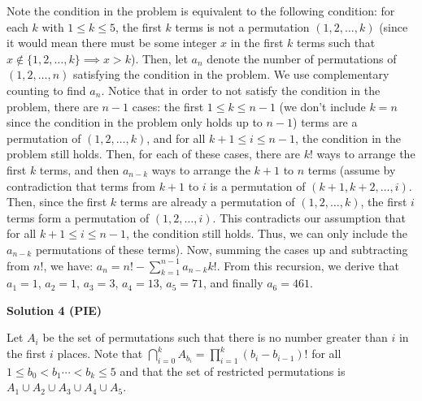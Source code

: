 \begin{enumerate}
Note the condition in the problem is equivalent to the following condition: for each $k$ with $1 \le k \le 5$, the first $k$ terms is not a permutation $(1, 2, \ldots, k)$ (since it would mean there must be some integer $x$ in the first $k$ terms such that $x \not \in \{1, 2, \ldots, k\} \implies x > k$). Then, let $a_n$ denote the number of permutations of $(1, 2, \ldots, n)$ satisfying the condition in the problem. We use complementary counting to find $a_n$. Notice that in order to not satisfy the condition in the problem, there are $n-1$ cases: the first $1 \le k \le n-1$ (we don't include $k = n$ since the condition in the problem only holds up to $n-1$) terms are a permutation of $(1, 2, \ldots, k)$, and for all $k+1 \le i \le n-1$, the condition in the problem still holds. Then, for each of these cases, there are $k!$ ways to arrange the first $k$ terms, and then $a_{n-k}$ ways to arrange the $k + 1$ to $n$ terms (assume by contradiction that terms from $k+1$ to $i$ is a permutation of $(k+1, k+2, \ldots, i)$. Then, since the first $k$ terms are already a permutation of $(1, 2, \ldots, k)$, the first $i$ terms form a permutation of $(1, 2, \ldots, i)$. This contradicts our assumption that for all $k+1 \le i \le n-1$, the condition still holds. Thus, we can only include the $a_{n-k}$ permutations of these terms). Now, summing the cases up and subtracting from $n!$, we have: $a_n = n! - \sum_{k=1}^{n-1} a_{n-k} k!$. From this recursion, we derive that $a_1 = 1$, $a_2 = 1$, $a_3 = 3$, $a_4 = 13$, $a_5 = 71$, and finally $a_6 = \boxed{461}$.

 



\textbf{Solution 4 (PIE)}

Let $A_i$ be the set of permutations such that there is no number greater than $i$ in the first $i$ places. Note that $\bigcap^{k}_{i=0}{A_{b_i}}=\prod^k_{i=1}{(b_i-b_{i-1})!}$ for all $1\le b_0 < b_1\cdots < b_k \le 5$ and that the set of restricted permutations is $A_1 \cup A_2 \cup A_3 \cup A_4 \cup A_5$.


\end{enumerate}
